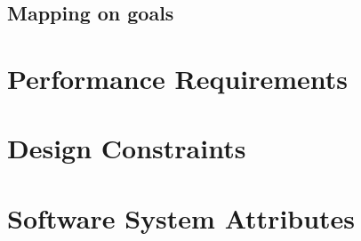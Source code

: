 \subsection{Mapping on goals}
\label{sec: Mapping on goals}


\clearpage
\section{Performance Requirements}
\label{sec:Performance Requirements}%


\section{Design Constraints}
\label{sec:Design Constraints}%


\section{Software System Attributes}
\label{sec:Software System Attributes}%
